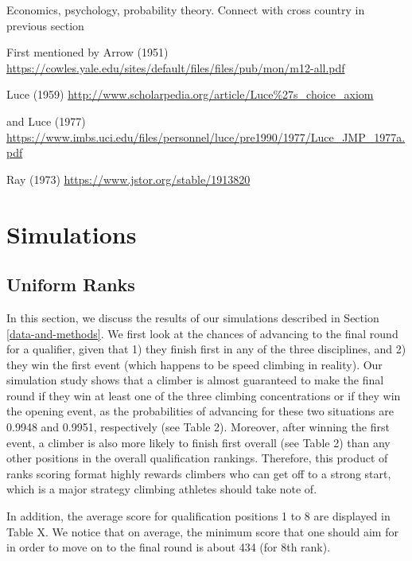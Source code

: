 \documentclass[12pt]{article}
\begin{document}
Economics, psychology, probability theory. Connect with cross country in
previous section

First mentioned by Arrow (1951)
\url{https://cowles.yale.edu/sites/default/files/files/pub/mon/m12-all.pdf}

Luce (1959)
\url{http://www.scholarpedia.org/article/Luce\%27s_choice_axiom}

and Luce (1977)
\url{https://www.imbs.uci.edu/files/personnel/luce/pre1990/1977/Luce_JMP_1977a.pdf}

Ray (1973) \url{https://www.jstor.org/stable/1913820}

\hypertarget{simulations}{%
\section{Simulations}\label{simulations}}

\hypertarget{uniform-ranks}{%
\subsection{Uniform Ranks}\label{uniform-ranks}}

In this section, we discuss the results of our simulations described in
Section \ref{data-and-methods}. We first look at the chances of
advancing to the final round for a qualifier, given that 1) they finish
first in any of the three disciplines, and 2) they win the first event
(which happens to be speed climbing in reality). Our simulation study
shows that a climber is almost guaranteed to make the final round if
they win at least one of the three climbing concentrations or if they
win the opening event, as the probabilities of advancing for these two
situations are 0.9948 and 0.9951, respectively (see Table 2). Moreover,
after winning the first event, a climber is also more likely to finish
first overall (see Table 2) than any other positions in the overall
qualification rankings. Therefore, this product of ranks scoring format
highly rewards climbers who can get off to a strong start, which is a
major strategy climbing athletes should take note of.

In addition, the average score for qualification positions 1 to 8 are
displayed in Table X. We notice that on average, the minimum score that
one should aim for in order to move on to the final round is about 434
(for 8th rank).
\end{document}
